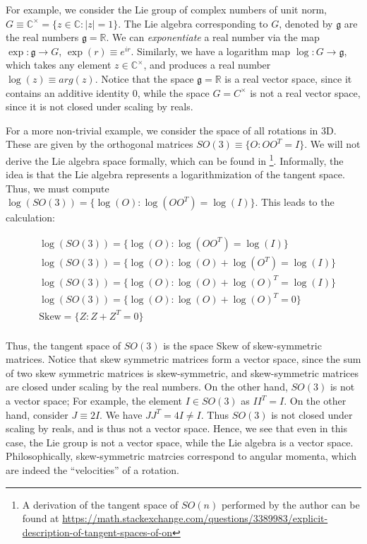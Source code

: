 \documentclass[11pt]{book}
\newcommand{\skewsym}{\mathrm{Skew}}
\newcommand{\C}{\ensuremath{\mathbb{C}}}
\begin{document}
For example, we consider the Lie group of complex numbers of unit norm,
$G \equiv \C^\times = \{ z \in \C : |z| = 1 \}$. The Lie algebra corresponding to $G$, denoted
by $\mathfrak g$ are the real numbers $\mathfrak g = \mathbb R$. We can \emph{exponentiate}
a real number via the map $\exp : \mathfrak g \rightarrow G$, $\exp(r) \equiv e^{i r}$. Similarly,
we have a logarithm map $\log: G \rightarrow \mathfrak g$, which takes any
element $z \in \C^\times$, and produces a real number $\log(z) \equiv arg(z)$.
Notice that the space $\mathfrak g = \mathbb R$ is a real vector space, since it contains an
additive identity $0$, while the space $G = C^\times$ is not a real vector space, since it
is not closed under scaling by reals.

For a more non-trivial example, we consider the space of all rotations in 3D. These are given
by the orthogonal matrices $SO(3) \equiv \{ O : O O ^T = I \}$. We will not derive the Lie algebra
space formally, which can be found in \cite{absil2009optimisation} \footnote{A derivation of the tangent space of $SO(n)$
performed by the author can be found at \url{https://math.stackexchange.com/questions/3389983/explicit-description-of-tangent-spaces-of-on}}.
Informally, the idea is that the Lie algebra represents a logarithmization of the tangent space. Thus,
we must compute $\log(SO(3)) = \{ \log(O): \log(O O^T) = \log(I) \}$. This leads to the calculation:

\begin{align*}
&\log(SO(3)) = \{ \log(O): \log(O O^T) = \log(I) \} \\
&\log(SO(3)) = \{ \log(O): \log(O) + \log(O^T) = \log(I) \} \\
&\log(SO(3)) = \{ \log(O): \log(O) + \log(O)^T = \log(I) \} \\
&\log(SO(3)) = \{ \log(O): \log(O) + \log(O)^T = 0 \} \\
&\skewsym = \{ Z: Z + Z^T = 0 \} \\
\end{align*}

Thus, the tangent space of $SO(3)$ is the space $\skewsym$ of skew-symmetric matrices. Notice that skew symmetric
matrices form a vector space, since the sum of two skew symmetric matrices is skew-symmetric, and skew-symmetric
matrices are closed under scaling by the real numbers. On the other hand, $SO(3)$ is not a vector space; For example,
the element $I \in SO(3)$ as $I I^T = I$. On the other hand, consider $J \equiv 2I$. We have
$J J^T = 4I \neq I$. Thus $SO(3)$ is not closed under scaling by reals, and is thus not a vector space. Hence,
we see that even in this case, the Lie group is not a vector space, while the Lie algebra is a vector space.
Philosophically, skew-symmetric matrcies correspond to angular momenta, which are indeed the ``velocities''
of a rotation.
\end{document}
